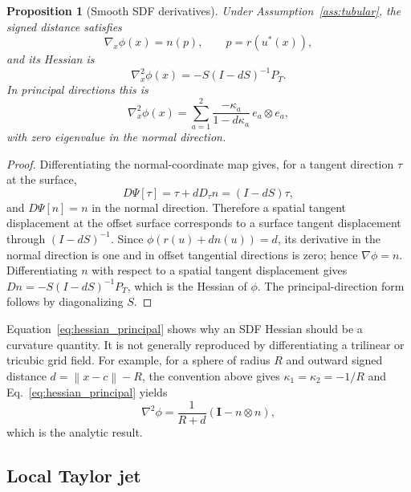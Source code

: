 \documentclass[preprint,12pt,sort&compress]{elsarticle}
\newtheorem{proposition}{Proposition}
\newcommand{\norm}[1]{\left\lVert #1 \right\rVert}
\newcommand{\Id}{\mathbf{I}}
\begin{document}
\begin{proposition}[Smooth SDF derivatives]
\label{prop:sdf_derivatives}
Under Assumption~\ref{ass:tubular}, the signed distance satisfies
\begin{equation}
 \nabla_x \phi(x)=n(p), \qquad p=r(u^*(x)),
\label{eq:grad_phi}
\end{equation}
and its Hessian is
\begin{equation}
 \nabla_x^2\phi(x) = -S(I-dS)^{-1}P_T.
\label{eq:hessian_operator}
\end{equation}
In principal directions this is
\begin{equation}
 \nabla_x^2\phi(x) = \sum_{a=1}^2 \frac{-\kappa_a}{1-d\kappa_a}\, e_a\otimes e_a,
\label{eq:hessian_principal}
\end{equation}
with zero eigenvalue in the normal direction.
\end{proposition}

\begin{proof}
Differentiating the normal-coordinate map gives, for a tangent direction $\tau$ at the surface,
\begin{equation}
 D\Psi[\tau] = \tau + d D_\tau n = (I-dS)\tau,
\end{equation}
and $D\Psi[n]=n$ in the normal direction. Therefore a spatial tangent displacement at the offset surface corresponds to a surface tangent displacement through $(I-dS)^{-1}$. Since $\phi(r(u)+dn(u))=d$, its derivative in the normal direction is one and in offset tangential directions is zero; hence $\nabla\phi=n$. Differentiating $n$ with respect to a spatial tangent displacement gives $D n = -S(I-dS)^{-1}P_T$, which is the Hessian of $\phi$. The principal-direction form follows by diagonalizing $S$.
\end{proof}

Equation~\eqref{eq:hessian_principal} shows why an SDF Hessian should be a curvature quantity. It is not generally reproduced by differentiating a trilinear or tricubic grid field. For example, for a sphere of radius $R$ and outward signed distance $d=\norm{x-c}-R$, the convention above gives $\kappa_1=\kappa_2=-1/R$ and Eq.~\eqref{eq:hessian_principal} yields
\begin{equation}
 \nabla^2\phi = \frac{1}{R+d}(\Id-n\otimes n),
\end{equation}
which is the analytic result.

\subsection{Local Taylor jet}
\end{document}
